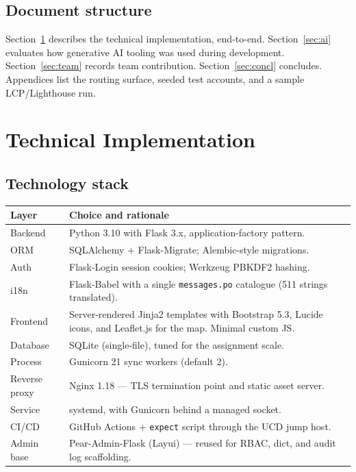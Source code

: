\subsection{Document structure}
Section~\ref{sec:tech} describes the technical implementation, end-to-end.
Section~\ref{sec:ai} evaluates how generative AI tooling was used during
development. Section~\ref{sec:team} records team contribution.
Section~\ref{sec:concl} concludes. Appendices list the routing surface,
seeded test accounts, and a sample LCP/Lighthouse run.

\section{Technical Implementation}\label{sec:tech}

\subsection{Technology stack}
\begin{tabularx}{\linewidth}{@{} l X @{}}
  \toprule
  \textbf{Layer} & \textbf{Choice and rationale} \\
  \midrule
  Backend         & Python 3.10 with Flask 3.x, application-factory pattern. \\
  ORM             & SQLAlchemy + Flask-Migrate; Alembic-style migrations. \\
  Auth            & Flask-Login session cookies; Werkzeug PBKDF2 hashing. \\
  i18n            & Flask-Babel with a single \texttt{messages.po}
                    catalogue (511 strings translated). \\
  Frontend        & Server-rendered Jinja2 templates with Bootstrap 5.3,
                    Lucide icons, and Leaflet.js for the map. Minimal
                    custom JS. \\
  Database        & SQLite (single-file), tuned for the assignment scale. \\
  Process         & Gunicorn 21 sync workers (default 2). \\
  Reverse proxy   & Nginx 1.18 — TLS termination point and static asset
                    server. \\
  Service         & systemd, with Gunicorn behind a managed socket. \\
  CI/CD           & GitHub Actions + \texttt{expect} script through the
                    UCD jump host. \\
  Admin base      & Pear-Admin-Flask (Layui) — reused for RBAC, dict,
                    and audit log scaffolding. \\
  \bottomrule
\end{tabularx}

